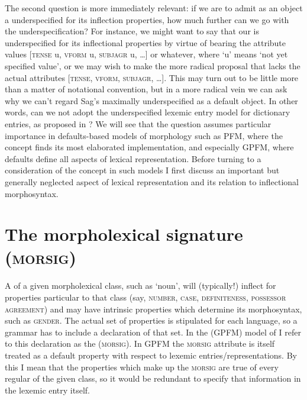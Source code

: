 \documentclass[output=paper]{langsci/langscibook}
\begin{document}
The second question is more immediately relevant: if we are to admit as an object a  underspecified for its inflection properties, how much further can we go with the underspecification? For instance, we might want to say that our   is underspecified for its inflectional properties by virtue of bearing the attribute values [\textsc{tense}  u, \textsc{vform}  u, \textsc{subjagr}  u, \ldots{}] or whatever, where `u' means `not yet specified value', or we may wish to make the more radical proposal that  lacks the actual attributes [\textsc{tense}, \textsc{vform}, \textsc{subjagr}, \ldots{}]. This may turn out to be little more than a matter of notational convention, but in a more radical vein we can ask why we can't regard Sag's maximally underspecified  as a default  object. %
In other words, can we not adopt the underspecified lexemic entry model for dictionary entries, as proposed in %
\citet{Spencer13}%
%
?  We will see that the question  assumes particular importance in defaults-based models of morphology such as PFM, where the  concept finds its most elaborated implementation, and especially GPFM, where defaults define all aspects of lexical representation. %
 Before turning to  a consideration of the  concept in such  models I first discuss an important but generally neglected aspect of lexical representation and its relation to inflectional morphosyntax.




\section{The morpholexical signature (\textsc{morsig})} \label{sec:Spencer:morsig}


A  of a given morpholexical class, such as `noun', will (typically!) inflect for properties particular to that class (say, \textsc{number, case, definiteness, possessor agreement}) and may have intrinsic properties which determine its morphosyntax, such as \textsc{gender}. The actual set of properties is stipulated for each language, so a grammar has to include a declaration of that set. In the (GPFM) model of %
\citet{Spencer13} %
%
I refer to this declaration as the  (\textsc{morsig}). In GPFM the \textsc{morsig} attribute is itself treated as a default property with respect to lexemic entries\slash{}representations. By this I mean that the properties which make up the \textsc{morsig} are true of every regular  of the given class, so it would be redundant to specify that information in the lexemic entry itself.
\end{document}
